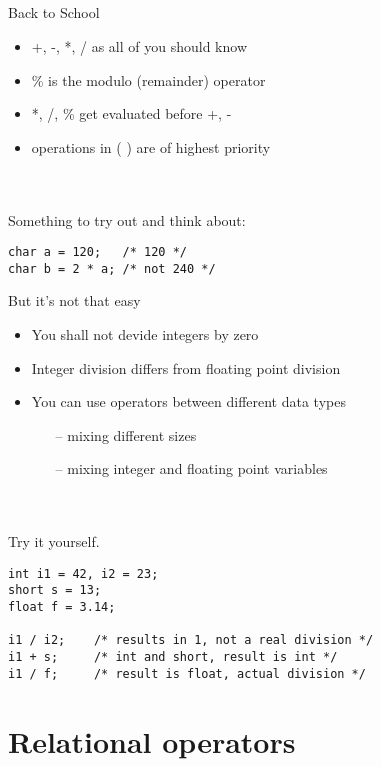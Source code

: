 \subsection{}
\begin{frame}[fragile]{Back to School}
	\begin{itemize}
		\item +, -, *, / as all of you should know
		\item \% is the modulo (remainder) operator
		\item *, /, \% get evaluated before +, -
		\item operations in (  ) are of highest priority
	\end{itemize}
	\ \\\ \\Something to try out and think about:
	\begin{lstlisting}[numbers=none]
char a = 120;	/* 120 */
char b = 2 * a;	/* not 240 */
\end{lstlisting}
\end{frame}
\begin{frame}[fragile]{But it's not that easy}
	\begin{itemize}
		\item You shall not devide integers by zero
		\item Integer division differs from floating point division
		\item You can use operators between different data types
		\begin{itemize}
			\item[--] mixing different sizes
			\item[--] mixing integer and floating point variables
		\end{itemize}
	\end{itemize}
	\ \\\ \\Try it yourself.
	\begin{lstlisting}[numbers=none]
int i1 = 42, i2 = 23;
short s = 13;
float f = 3.14;

i1 / i2;	/* results in 1, not a real division */
i1 + s;		/* int and short, result is int */
i1 / f;		/* result is float, actual division */
\end{lstlisting}
\end{frame}
\section{Relational operators}
